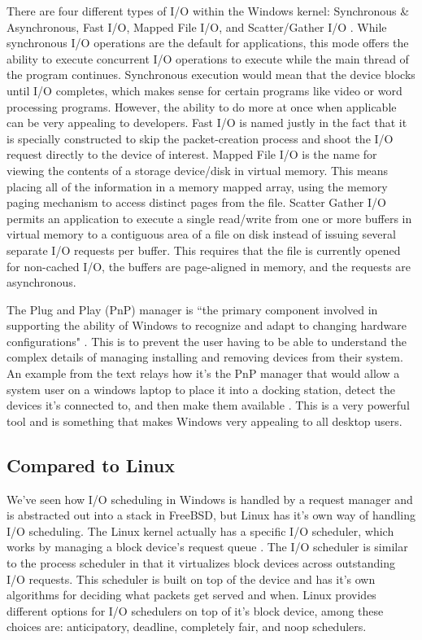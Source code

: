 \documentclass[10pt,draftclsnofoot,onecolumn]{IEEEtran}
\begin{document}
\par There are four different types of I/O within the Windows kernel: Synchronous \& Asynchronous, Fast I/O, Mapped File I/O, and Scatter/Gather I/O \cite{win:2}.
While synchronous I/O operations are the default for applications, this mode offers the ability to execute concurrent I/O operations to execute while the main thread of the program continues.
Synchronous execution would mean that the device blocks until I/O completes, which makes sense for certain programs like video or word processing programs.
However, the ability to do more at once when applicable can be very appealing to developers.
Fast I/O is named justly in the fact that it is specially constructed to skip the packet-creation process and shoot the I/O request directly to the device of interest.
Mapped File I/O is the name for viewing the contents of a storage device/disk in virtual memory.
This means placing all of the information in a memory mapped array, using the memory paging mechanism to access distinct pages from the file.
Scatter Gather I/O permits an application to execute a single read/write from one or more buffers in virtual memory to a contiguous area of a file on disk instead of issuing several separate I/O requests per buffer.
This requires that the file is currently opened for non-cached I/O, the buffers are page-aligned in memory, and the requests are asynchronous.

\par The Plug and Play (PnP) manager is ``the primary component involved in supporting the ability of Windows to recognize and adapt to changing hardware configurations" \cite{win:2}.
This is to prevent the user having to be able to understand the complex details of managing installing and removing devices from their system.
An example from the text relays how it's the PnP manager that would allow a system user on a windows laptop to place it into a docking station, detect the devices it's connected to, and then make them available \cite{win:2}.
This is a very powerful tool and is something that makes Windows very appealing to all desktop users.

\subsection{Compared to Linux}
\label{sub:Scheduling Linux}
\par We've seen how I/O scheduling in Windows is handled by a request manager and is abstracted out into a stack in FreeBSD, but Linux has it's own way of handling I/O scheduling.
The Linux kernel actually has a specific I/O scheduler, which works by managing a block device's request queue \cite{linux:1}.
The I/O scheduler is similar to the process scheduler in that it virtualizes block devices across outstanding I/O requests.
This scheduler is built on top of the device and has it's own algorithms for deciding what packets get served and when.
Linux provides different options for I/O schedulers on top of it's block device, among these choices are: anticipatory, deadline, completely fair, and noop schedulers.
\end{document}
